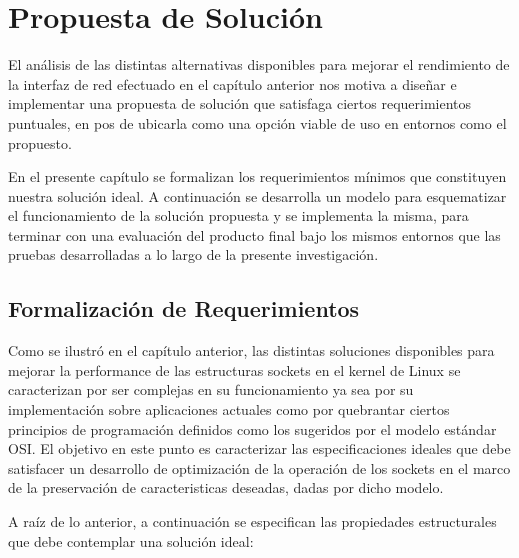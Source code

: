 \chapter{Propuesta de Solución}
El análisis de las distintas alternativas disponibles para mejorar el rendimiento de la interfaz de red efectuado en el capítulo anterior nos motiva a diseñar e implementar una propuesta de solución que satisfaga ciertos requerimientos puntuales, en pos de ubicarla como una opción viable de uso en entornos como el propuesto.

En el presente capítulo se formalizan los requerimientos mínimos que constituyen nuestra solución ideal. A continuación se desarrolla un modelo para esquematizar el funcionamiento de la solución propuesta y se implementa la misma, para terminar con una evaluación del producto final bajo los mismos entornos que las pruebas desarrolladas a lo largo de la presente investigación.

\section{Formalización de Requerimientos}
Como se ilustró en el capítulo anterior, las distintas soluciones disponibles para mejorar la performance de las estructuras sockets en el kernel de Linux se caracterizan por ser complejas en su funcionamiento ya sea por su implementación sobre aplicaciones actuales como por quebrantar ciertos principios de programación definidos como los sugeridos por el modelo estándar OSI. El objetivo en este punto es caracterizar las especificaciones ideales que debe satisfacer un desarrollo de optimización de la operación de los sockets en el marco de la preservación de caracteristicas deseadas, dadas por dicho modelo.

A raíz de lo anterior, a continuación se especifican las propiedades estructurales que debe contemplar una solución ideal:


